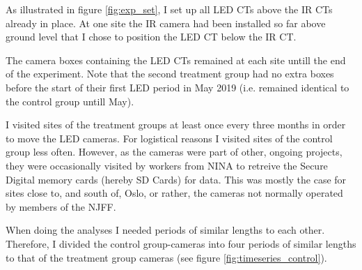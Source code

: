 As illustrated in figure \vref{fig:exp_set}, I set up all LED CTs above the IR CTs already in place. 
At one site the IR camera had been installed so far above ground level that I chose to position the LED CT below the IR CT. %

The camera boxes containing the LED CTs remained at each site untill the end of the experiment. Note that the second treatment group had no extra boxes before the start of their first LED period in May 2019 (i.e. remained identical to the control group untill May). 





I visited sites of the treatment groups at least once every three months in order to move the LED cameras. For logistical reasons I visited sites of the control group less often.
However, as the cameras were part of other, ongoing projects, they were occasionally visited by workers from NINA to retreive the Secure Digital memory cards (hereby SD Cards) for data. %
This was mostly the case for sites close to, and south of, Oslo, or rather, the cameras not normally operated by members of the NJFF.

When doing the analyses I needed periods of similar lengths to each other. Therefore, I divided the control group-cameras into four periods of similar lengths to that of the treatment group cameras (see figure \ref{fig:timeseries_control}). %




